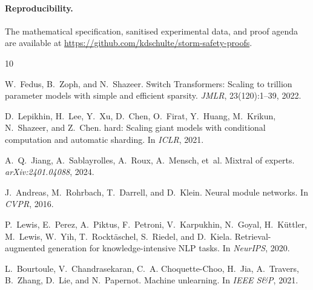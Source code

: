 \documentclass[11pt,a4paper]{article}
\begin{document}
\paragraph{Reproducibility.}
The mathematical specification, sanitised experimental data, and proof agenda are available at \url{https://github.com/kdschulte/storm-safety-proofs}.

\begin{thebibliography}{10}

W.~Fedus, B.~Zoph, and N.~Shazeer.
\newblock Switch {T}ransformers: Scaling to trillion parameter models with simple and efficient sparsity.
\newblock \emph{JMLR}, 23(120):1--39, 2022.

D.~Lepikhin, H.~Lee, Y.~Xu, D.~Chen, O.~Firat, Y.~Huang, M.~Krikun, N.~Shazeer, and Z.~Chen.
hard: Scaling giant models with conditional computation and automatic sharding.
\newblock In \emph{ICLR}, 2021.

A.~Q.~Jiang, A.~Sablayrolles, A.~Roux, A.~Mensch, et~al.
\newblock Mixtral of experts.
\newblock \emph{arXiv:2401.04088}, 2024.

J.~Andreas, M.~Rohrbach, T.~Darrell, and D.~Klein.
\newblock Neural module networks.
\newblock In \emph{CVPR}, 2016.

P.~Lewis, E.~Perez, A.~Piktus, F.~Petroni, V.~Karpukhin, N.~Goyal, H.~K\"{u}ttler, M.~Lewis, W.~Yih, T.~Rockt\"{a}schel, S.~Riedel, and D.~Kiela.
\newblock Retrieval-augmented generation for knowledge-intensive {NLP} tasks.
\newblock In \emph{NeurIPS}, 2020.

L.~Bourtoule, V.~Chandrasekaran, C.~A. Choquette-Choo, H.~Jia, A.~Travers, B.~Zhang, D.~Lie, and N.~Papernot.
\newblock Machine unlearning.
\newblock In \emph{IEEE S\&P}, 2021.

\end{thebibliography}
\end{document}
